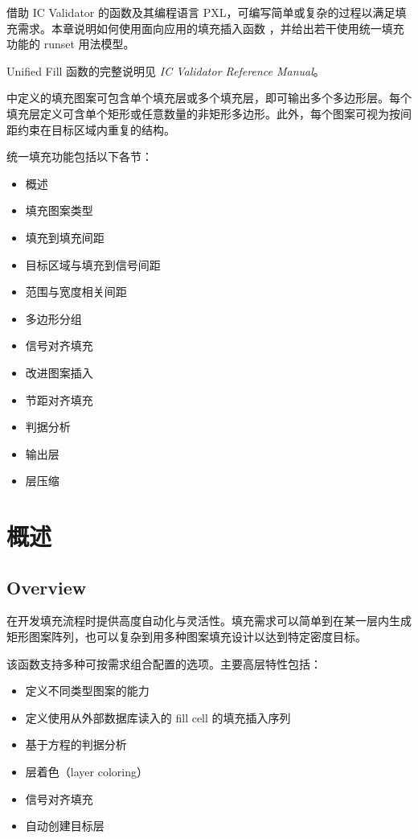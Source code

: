 \label{chap:fill}

借助 IC Validator 的函数及其编程语言 PXL，可编写简单或复杂的过程以满足填充需求。本章说明如何使用面向应用的填充插入函数 ，并给出若干使用统一填充功能的 runset 用法模型。

\begin{noteBox}
Unified Fill 函数的完整说明见 \textit{IC Validator Reference Manual}。
\end{noteBox}

 中定义的填充图案可包含单个填充层或多个填充层，即可输出多个多边形层。每个填充层定义可含单个矩形或任意数量的非矩形多边形。此外，每个图案可视为按间距约束在目标区域内重复的结构。

统一填充功能包括以下各节：
\begin{itemize}
  \item 概述
  \item 填充图案类型
  \item 填充到填充间距
  \item 目标区域与填充到信号间距
  \item 范围与宽度相关间距
  \item 多边形分组
  \item 信号对齐填充
  \item 改进图案插入
  \item 节距对齐填充
  \item 判据分析
  \item 输出层
  \item 层压缩
\end{itemize}

\section{概述}
\subsection*{Overview}

 在开发填充流程时提供高度自动化与灵活性。填充需求可以简单到在某一层内生成矩形图案阵列，也可以复杂到用多种图案填充设计以达到特定密度目标。

该函数支持多种可按需求组合配置的选项。主要高层特性包括：
\begin{itemize}
  \item 定义不同类型图案的能力
  \item 定义使用从外部数据库读入的 fill cell 的填充插入序列
  \item 基于方程的判据分析
  \item 层着色（layer coloring）
  \item 信号对齐填充
  \item 自动创建目标层
\end{itemize}

